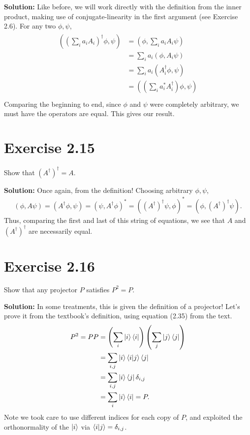 \documentclass{book}
\begin{document}
    \textbf{Solution:} Like before, we will work directly with the definition from the inner product, making use of conjugate-linearity in the first argument (see Exercise 2.6). For any two $\phi, \psi$,
    \begin{align}
    \begin{aligned}
        ( (\sum_i a_i A_i)^\dagger \phi, \psi) &= (\phi, \sum_i a_i A_i \psi) \\
        &= \sum_i a_i (\phi, A_i \psi) \\
        &=\sum_i a_i (A_i^\dagger \phi, \psi) \\
        &= ((\sum_i a_i^* A_i^\dagger) \phi, \psi) \\
    \end{aligned}
    \end{align}
    Comparing the beginning to end, since $\phi$ and $\psi$ were completely arbitrary, we must have the operators are equal. This gives our result.
    
\section*{Exercise 2.15}
    Show that $(A^\dagger)^\dagger = A$.
    
    \textbf{Solution:} Once again, from the definition! Choosing arbitrary $\phi, \psi$,
    \begin{align}
        (\phi, A\psi) = (A^\dagger \phi, \psi) = (\psi, A^\dagger\phi)^* = ((A^\dagger)^\dagger \psi, \phi)^* = (\phi, (A^\dagger)^\dagger \psi).
    \end{align}
    Thus, comparing the first and last of this string of equations, we see that $A$ and $(A^\dagger)^\dagger$ are necessarily equal.
    
\section*{Exercise 2.16}
    Show that any projector $P$ satisfies $P^2 = P$.
    
    \textbf{Solution:} In some treatments, this is given the definition of a projector! Let's prove it from the textbook's definition, using equation (2.35) from the text.
    \begin{align}
    \begin{aligned}
        P^2 = P P &= \left(\sum_i \ket{i}\bra{i}\right)\left(\sum_j \ket{j}\bra{j}\right) \\ 
        &= \sum_{i,j} \ket{i}\bra{i}\ket{j}\bra{j} \\
        &= \sum_{i,j} \ket{i}\bra{j} \delta_{i,j} \\
        &= \sum_{i} \ket{i}\bra{i} = P.
    \end{aligned}
    \end{align}
    Note we took care to use different indices for each copy of $P$, and exploited the orthonormality of the $\ket{i}$ via $\braket{i}{j} = \delta_{i,j}$.
    
\end{document}

